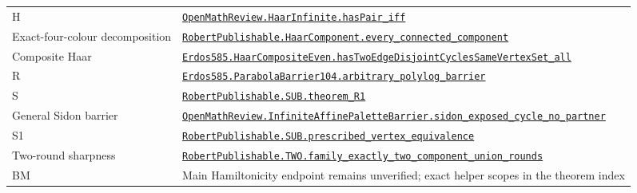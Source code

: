 \documentclass[smallextended]{svjour3}
\begin{document}
{\begin{longtable}[]{@{}
  >{\raggedright\arraybackslash}p{}
  >{\raggedright\arraybackslash}p{}@{}}
H &
\href{https://github.com/alejandrozu/openmath-2026-judging/blob/70c5ec3107658182f22c207d4c50f53f9cb3e602/robert-review-2026-10-07/lean/HaarInfinite.lean\#L110}{{\ttfamily\nolinkurl{OpenMathReview.HaarInfinite.hasPair_iff}}} \\
Exact-four-colour decomposition &
\href{https://github.com/alejandrozu/openmath-2026-judging/blob/70c5ec3107658182f22c207d4c50f53f9cb3e602/robert-review-2026-10-07/lean/HaarComponents.lean\#L73}{{\ttfamily\nolinkurl{RobertPublishable.HaarComponent.every_connected_component}}} \\
Composite Haar &
\href{https://github.com/alejandrozu/openmath-2026-judging/blob/70c5ec3107658182f22c207d4c50f53f9cb3e602/robert-review-2026-10-07/lean/Openmath/Proofs/HaarCompositeEven.lean\#L441}{{\ttfamily\nolinkurl{Erdos585.HaarCompositeEven.hasTwoEdgeDisjointCyclesSameVertexSet_all}}} \\
R &
\href{https://github.com/alejandrozu/openmath-2026-judging/blob/70c5ec3107658182f22c207d4c50f53f9cb3e602/robert-review-2026-10-07/lean/Openmath/Proofs/ParabolaBarrier104.lean\#L145}{{\ttfamily\nolinkurl{Erdos585.ParabolaBarrier104.arbitrary_polylog_barrier}}} \\
S &
\href{https://github.com/alejandrozu/openmath-2026-judging/blob/70c5ec3107658182f22c207d4c50f53f9cb3e602/robert-review-2026-10-07/lean/R1.lean\#L13}{{\ttfamily\nolinkurl{RobertPublishable.SUB.theorem_R1}}} \\
General Sidon barrier &
\href{https://github.com/alejandrozu/openmath-2026-judging/blob/70c5ec3107658182f22c207d4c50f53f9cb3e602/robert-review-2026-10-07/lean/InfiniteAffinePaletteBarrier.lean\#L54}{{\ttfamily\nolinkurl{OpenMathReview.InfiniteAffinePaletteBarrier.sidon_exposed_cycle_no_partner}}} \\
S1 &
\href{https://github.com/alejandrozu/openmath-2026-judging/blob/70c5ec3107658182f22c207d4c50f53f9cb3e602/robert-review-2026-10-07/lean/PrescribedVertex.lean\#L89}{{\ttfamily\nolinkurl{RobertPublishable.SUB.prescribed_vertex_equivalence}}} \\
Two-round sharpness &
\href{https://github.com/alejandrozu/openmath-2026-judging/blob/70c5ec3107658182f22c207d4c50f53f9cb3e602/robert-review-2026-10-07/lean/CycleComposition.lean\#L171}{{\ttfamily\nolinkurl{RobertPublishable.TWO.family_exactly_two_component_union_rounds}}} \\
BM & Main Hamiltonicity endpoint remains unverified; exact helper scopes
in the theorem index \\
\end{longtable}
}
\end{document}
